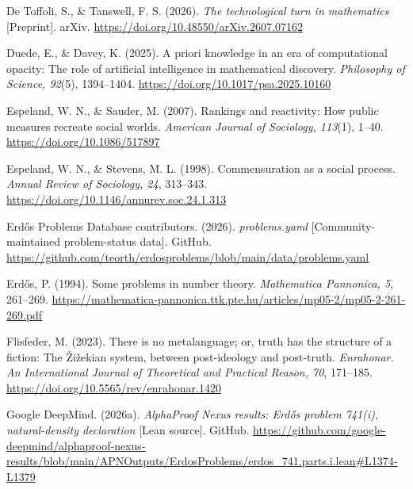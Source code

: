 \documentclass[pdflatex,sn-apa]{sn-jnl}
\begin{document}
\noindent\hangindent=0.5in De Toffoli, S., \& Tanswell, F. S. (2026). \emph{The technological turn in mathematics} [Preprint]. arXiv. \url{https://doi.org/10.48550/arXiv.2607.07162}\par\medskip

\noindent\hangindent=0.5in Duede, E., \& Davey, K. (2025). A priori knowledge in an era of computational opacity: The role of artificial intelligence in mathematical discovery. \emph{Philosophy of Science, 92}(5), 1394--1404. \url{https://doi.org/10.1017/psa.2025.10160}\par\medskip

\noindent\hangindent=0.5in Espeland, W. N., \& Sauder, M. (2007). Rankings and reactivity: How public measures recreate social worlds. \emph{American Journal of Sociology, 113}(1), 1--40. \url{https://doi.org/10.1086/517897}\par\medskip

\noindent\hangindent=0.5in Espeland, W. N., \& Stevens, M. L. (1998). Commensuration as a social process. \emph{Annual Review of Sociology, 24}, 313--343. \url{https://doi.org/10.1146/annurev.soc.24.1.313}\par\medskip

\noindent\hangindent=0.5in Erdős Problems Database contributors. (2026). \emph{problems.yaml} [Community-maintained problem-status data]. GitHub. \url{https://github.com/teorth/erdosproblems/blob/main/data/problems.yaml}\par\medskip

\noindent\hangindent=0.5in Erdős, P. (1994). Some problems in number theory. \emph{Mathematica Pannonica, 5}, 261--269. \url{https://mathematica-pannonica.ttk.pte.hu/articles/mp05-2/mp05-2-261-269.pdf}\par\medskip

\noindent\hangindent=0.5in Flisfeder, M. (2023). There is no metalanguage; or, truth has the structure of a fiction: The Žižekian system, between post-ideology and post-truth. \emph{Enrahonar. An International Journal of Theoretical and Practical Reason, 70}, 171--185. \url{https://doi.org/10.5565/rev/enrahonar.1420}\par\medskip

\noindent\hangindent=0.5in Google DeepMind. (2026a). \emph{AlphaProof Nexus results: Erdős problem 741(i), natural-density declaration} [Lean source]. GitHub. \url{https://github.com/google-deepmind/alphaproof-nexus-results/blob/main/APNOutputs/ErdosProblems/erdos_741.parts.i.lean#L1374-L1379}\par\medskip
\end{document}
